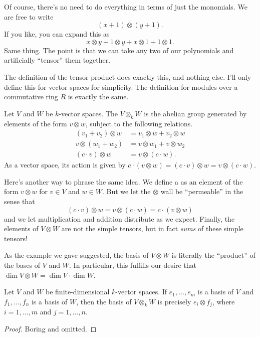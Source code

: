 Of course, there's no need to do everything in terms of just the monomials.
We are free to write
\[ (x + 1) \otimes (y + 1). \]
If you like, you can expand this as
\[ x \otimes y + 1 \otimes y + x \otimes 1 + 1 \otimes 1. \]
Same thing.
The point is that we can take any two of our polynomials
and artificially ``tensor'' them together.


The definition of the tensor product does exactly this,
and nothing else.
I'll only define this for vector spaces for simplicity.
The definition for modules over a commutative ring $R$ is exactly the same.
\begin{definition}
	Let $V$ and $W$ be $k$-vector spaces.
	The  $V \otimes_k W$ is the abelian group
	generated by elements of the form $v \otimes w$,
	subject to the following relations.
	\begin{align*}
		(v_1 + v_2) \otimes w &= v_1 \otimes w + v_2 \otimes w \\
		v \otimes (w_1 + w_2) &= v \otimes w_1 + v \otimes w_2 \\
		(c \cdot v) \otimes w &= v \otimes (c \cdot w).
	\end{align*}
	As a vector space,
	its action is given by
	$c \cdot (v \otimes w) = (c \cdot v) \otimes w = v \otimes (c \cdot w)$.
\end{definition}
Here's another way to phrase the same idea.
We define a  as an
element of the form $v \otimes w$ for $v \in V$ and $w \in W$.
But we let the $\otimes$ wall be ``permeable'' in the sense that
\[ (c \cdot v) \otimes w = v \otimes (c \cdot w) = c \cdot (v \otimes w) \]
and we let multiplication and addition distribute as we expect.
Finally, the elements of $V \otimes W$ are not the simple tensors,
but in fact \emph{sums} of these simple tensors!

As the example we gave suggested,
the basis of $V \otimes W$ is literally the ``product''
of the bases of $V$ and $W$.
In particular, this fulfills our desire that $\dim V \otimes W
= \dim V \cdot \dim W$.
\begin{proposition}
	Let $V$ and $W$ be finite-dimensional $k$-vector spaces.
	If $e_1, \dots, e_m$ is a basis of $V$ and $f_1, \dots, f_n$ is a basis of $W$,
	then the basis of $V \otimes_k W$
	is precisely $e_i \otimes f_j$, where $i=1,\dots,m$ and $j=1,\dots,n$.
\end{proposition}
\begin{proof}
	Boring and omitted.
\end{proof}

